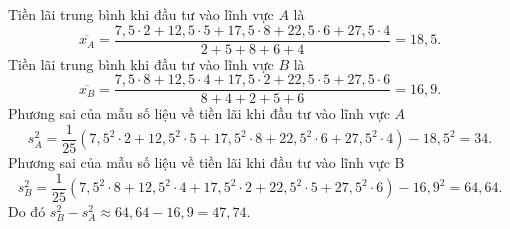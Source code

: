 \begin{bt}
{\begin{center}
\begin{tabular}{|c|c|c|c|c|c|}
				\hline
			\end{tabular}
		\end{center}
		Tiền lãi trung bình khi đầu tư vào lĩnh vực $A$ là
		$$
		\overline{x_A}=\dfrac{7{,}5\cdot 2+12{,}5\cdot 5+17{,}5\cdot 8+22{,}5 \cdot 6+27{,}5\cdot 4}{2+5+8+6+4}=18{,}5.$$
		Tiền lãi trung bình khi đầu tư vào lĩnh vực $B$ là
		$$\overline{x_B}=\dfrac{7{,}5\cdot 8+12{,}5\cdot 4+17{,}5\cdot 2+22{,}5\cdot 5+27{,}5\cdot 6}{8+4+2+5+6}=16{,}9.$$
		Phương sai của mẫu số liệu về tiền lãi khi đầu tư vào lĩnh vực $A$
		$$s_A^2=\dfrac{1}{25}\left(7{,}5^2 \cdot 2+12{,}5^2\cdot 5+17{,}5^2\cdot 8+22{,}5^2 \cdot 6+27{,}5^2 \cdot 4\right)-18{,}5^2=34.$$
		Phương sai của mẫu số liệu về tiền lãi khi đầu tư vào lĩnh vực B
		$$s_B^2=\dfrac{1}{25}\left(7{,}5^2\cdot 8+12{,}5^2\cdot 4+17{,}5^2\cdot 2+22{,}5^2\cdot 5+27{,}5^2\cdot 6\right)-16{,}9^2=64{,}64.$$
		Do đó $s_B^2-s_A^2 \approx 64{,}64-16{,}9=47{,}74$.
	}
\end{bt}

